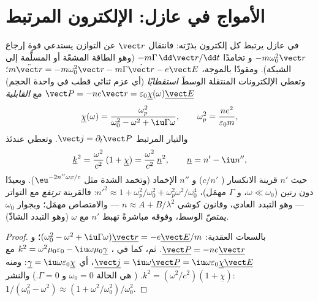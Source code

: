 \section{الأمواج في عازل: الإلكترون المرتبط}

\begin{proposition}\label{prop:b2:waves-in-media:lorentz}
في عازل يرتبط كل إلكترون بذرّته: فانتقال
$\vect r$ عن التوازن يستدعي قوة إرجاع $-m\omega_0^2\vect r$ و
تخامدًا $-m\Gamma\,\dd\vect r/\dd t$ (وهو الطاقة المشعّة أو المسلَّمة إلى
الشبكة). ومقودًا بالموجة، $m\ddot{\vect r} = -m\omega_0^2\vect r - m\Gamma\dot{\vect r}
- e\vect E$؛ وتعطي الإلكترونات المنتقلة الوسطَ \emph{استقطابًا}
(أي عزم ثنائي قطب في واحدة الحجم) $\vect P = -ne\vect r = \varepsilon_0\underline\chi(\omega)
\underline{\vect E}$ مع \emph{القابلية}
\[
\underline\chi(\omega) = \frac{\omega_p^2}{\omega_0^2 - \omega^2 + \iu\Gamma\omega} ,
\qquad \omega_p^2 = \frac{ne^2}{\varepsilon_0m} ,
\]
والتيار المرتبط $\vect j = \partial_t\vect P$. وتعطي  عندئذ
\[
\underline k^2 = \frac{\omega^2}{c^2}\,(1 + \underline\chi) = \frac{\omega^2}{c^2}\,\underline n^2 ,
\qquad \underline n = n' - \iu n'' ,
\]
حيث $n'$ قرينة الانكسار ( $c/n'$) و $n''$
الإخماد (وتخمد الشدة مثل $\eu^{-2n''\omega x/c}$). وبعيدًا دون
رنين ($\omega \ll \omega_0$، و $\Gamma$ مهمَل)، $n'^2 \approx 1 + \omega_p^2/\omega_0^2 +
\omega_p^2\omega^2/\omega_0^4$: فالقرينة \emph{ترتفع} مع التواتر --- وهو التبدد
العادي، وقانون كوشي $n \approx A + B/\lambda^2$ --- والامتصاص
مهمَل؛ وبجوار $\omega_0$ يمتصّ الوسط، وفوقه مباشرةً تهبط $n'$
مع $\omega$ (وهو التبدد الشاذّ).
\end{proposition}

\begin{proof}
بالسعات العقدية: $(\omega_0^2 - \omega^2 + \iu\Gamma\omega)\underline{\vect r} = -e\underline{\vect E}
/m$؛ و $\underline{\vect P} = -ne\underline{\vect r}$. ثم، كما في ، $k^2 = \omega^2\mu_0
\varepsilon_0 - \iu\omega\mu_0\underline\gamma$ مع $\underline{\vect j} = \iu\omega\underline{\vect P} = \iu\omega\varepsilon_0
\underline\chi\underline{\vect E}$، أي $\underline\gamma = \iu\omega\varepsilon_0\underline\chi$: ومنه $k^2 = (\omega^2/c^2)
(1 + \underline\chi)$. ( هي الحالة $\omega_0 = 0$ و $\Gamma = 0$.)
والنشر: $1/(\omega_0^2 - \omega^2) \approx (1 + \omega^2/\omega_0^2)/\omega_0^2$.
\end{proof}

